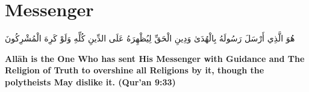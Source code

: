 \chapter{Messenger}
\begin{center}
    {\Huge    
        \begin{Arabic}
            هُوَ الَّذِي أَرْسَلَ رَسُولَهُ بِالْهُدَىٰ وَدِينِ الْحَقِّ لِيُظْهِرَهُ عَلَى الدِّينِ كُلِّهِ وَلَوْ كَرِهَ الْمُشْرِكُونَ
        \end{Arabic}
    }    
\end{center}
\vspace*{\fill}
\vspace{3cm}
\begin{center}
    \large \textbf{Allāh is the One Who has sent His Messenger with Guidance and The Religion of Truth to overshine all Religions by it, though the polytheists May dislike it. (Qur'an 9:33)}
\end{center}
